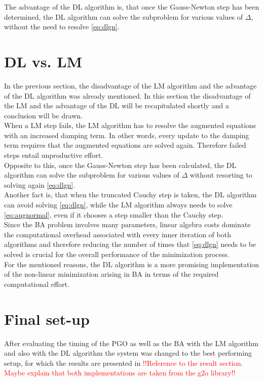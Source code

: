 The advantage of the \ac{DL} algorithm is, that once the Gauss-Newton step has been determined, the \ac{DL} algorithm can solve the subproblem for various values of $\Delta$, without the need to resolve \autoref{eq:dlgn}.

\section{\ac{DL} vs. \ac{LM}}
In the previous section, the disadvantage of the \ac{LM} algorithm and the advantage of the \ac{DL} algorithm was already mentioned. In this section the disadvantage of the \ac{LM} and the advantage of the \ac{DL} will be recapitulated shortly and a conclusion will be drawn.\\

When a \ac{LM} step fails, the \ac{LM} algorithm has to resolve the augmented equations with an increased damping term. In other words, every update to the damping term requires that the augmented equations are solved again. Therefore failed steps entail unproductive effort.\\
Opposite to this, once the Gauss-Newton step has been calculated, the \ac{DL} algorithm can solve the subproblem for various values of $\Delta$ without resorting to solving again \autoref{eq:dlgn}.\\
Another fact is, that when the truncated Cauchy step is taken, the \ac{DL} algorithm can avoid solving \autoref{eq:dlgn}, while the \ac{LM} algorithm always needs to solve \autoref{eq:augnormal}, even if it chooses a step smaller than the Cauchy step.\\

Since the \ac{BA} problem involves many parameters, linear algebra costs dominate the computational overhead associated with every inner iteration of both algorithms and therefore reducing the number of times that \autoref{eq:dlgn} needs to be solved is crucial for the overall performance of the minimization process.\\
For the mentioned reasons, the \ac{DL} algorithm is a more promising implementation of the non-linear minimization arising in \ac{BA} in terms of the required computational effort.

\section{Final set-up}
After evaluating the timing of the \ac{PGO} as well as the \ac{BA} with the \ac{LM} algorithm and also with the \ac{DL} algorithm the system was changed to the best performing setup, for which the results are presented in \textcolor{red}{!!Reference to the result section. Maybe explain that both implementations are taken from the g2o library!!}
